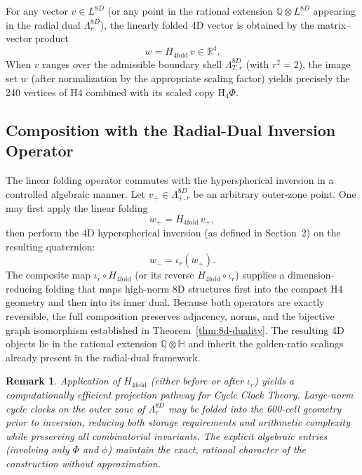 \documentclass{article}
\newtheorem{remark}{Remark}
\begin{document}
For any vector \(v \in L^{8D}\) (or any point in the rational extension \(\mathbb{Q} \otimes L^{8D}\) appearing in the radial dual \(\Lambda_r^{8D}\)), the linearly folded 4D vector is obtained by the matrix–vector product
\begin{equation}
w = H_{4\mathrm{fold}} \, v \in \mathbb{R}^4.
\end{equation}
When \(v\) ranges over the admissible boundary shell \(\Lambda_{T,r}^{8D}\) (with \(r^2 = 2\)), the image set \(w\) (after normalization by the appropriate scaling factor) yields precisely the 240 vertices of H4 combined with its scaled copy \(\mathrm{H}_4\Phi\).
\subsection{Composition with the Radial-Dual Inversion Operator}
The linear folding operator commutes with the hyperspherical inversion in a controlled algebraic manner. Let \(v_+ \in \Lambda_{+,r}^{8D}\) be an arbitrary outer-zone point. One may first apply the linear folding
\[
w_+ = H_{4\mathrm{fold}} \, v_+,
\]
then perform the 4D hyperspherical inversion (as defined in Section~2) on the resulting quaternion:
\[
w_- = \iota_r(w_+).
\]
The composite map \(\iota_r \circ H_{4\mathrm{fold}}\) (or its reverse \(H_{4\mathrm{fold}} \circ \iota_r\)) supplies a dimension-reducing folding that maps high-norm 8D structures first into the compact H4 geometry and then into its inner dual. Because both operators are exactly reversible, the full composition preserves adjacency, norms, and the bijective graph isomorphism established in Theorem~\ref{thm:8d-duality}. The resulting 4D objects lie in the rational extension \(\mathbb{Q} \otimes \mathbb{H}\) and inherit the golden-ratio scalings already present in the radial-dual framework.
\begin{remark}
Application of \(H_{4\mathrm{fold}}\) (either before or after \(\iota_r\)) yields a computationally efficient projection pathway for Cycle Clock Theory. Large-norm cycle clocks on the outer zone of \(\Lambda_r^{8D}\) may be folded into the 600-cell geometry prior to inversion, reducing both storage requirements and arithmetic complexity while preserving all combinatorial invariants. The explicit algebraic entries (involving only \(\Phi\) and \(\phi\)) maintain the exact, rational character of the construction without approximation.
\end{remark}
\end{document}
